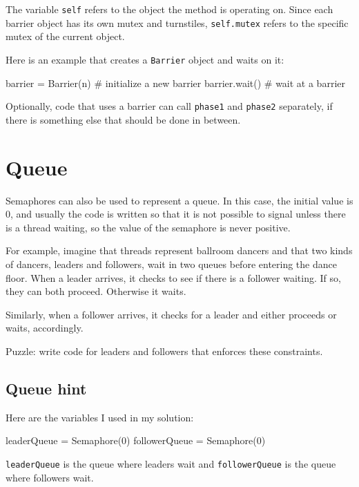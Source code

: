 \documentclass{book}
\begin{document}
The variable {\tt self} refers to the object the method
is operating on.  Since each barrier object has its own
mutex and turnstiles, {\tt self.mutex} refers to the specific
mutex of the current object.

Here is an example that creates a {\tt Barrier}
object and waits on it:

\begin{unbreakable}[title={Barrier interface}]{}
barrier = Barrier(n)        # initialize a new barrier
barrier.wait()              # wait at a barrier
\end{unbreakable}

Optionally, code that uses a barrier can call {\tt phase1} and
    {\tt phase2} separately, if there is something else that
should be done in between.



\section{Queue}
\label{dancers}

Semaphores can also be used to represent a queue.  In this
case, the initial value is 0, and usually the code is written
so that it is not possible
to signal unless there is a thread waiting, so the value of the
semaphore is never positive.

For example, imagine that threads represent ballroom dancers
and that two kinds of dancers, leaders and followers, wait
in two queues before entering the dance floor.  When a leader
arrives, it checks to see if there is a follower waiting.
If so, they can both proceed.  Otherwise it waits.

Similarly, when a follower arrives, it checks for a leader and
either proceeds or waits, accordingly.

Puzzle: write code for leaders and followers that enforces these
constraints.




\subsection {Queue hint}

Here are the variables I used in my solution:

\begin{unbreakable}[title={Queue hint}]{}
leaderQueue = Semaphore(0)
followerQueue = Semaphore(0)
\end{unbreakable}

{\tt leaderQueue} is the queue where leaders wait
and {\tt followerQueue} is the queue where followers wait.
\end{document}
